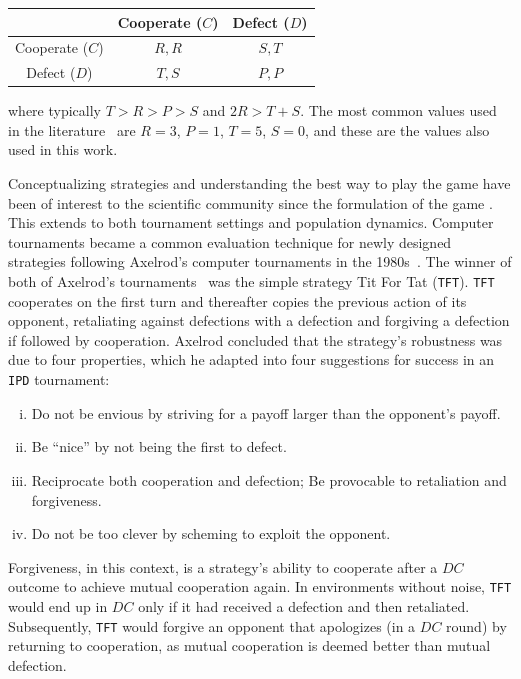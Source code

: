 \documentclass{article}
\def\TFT{\texttt{TFT}}
\def\IPD{\texttt{IPD}}
\begin{document}
\begin{center}
{\renewcommand{\arraystretch}{2}%
\begin{tabular}{c|c|c}
& Cooperate (\(C\)) & Defect (\(D\)) \\
\hline
Cooperate (\(C\)) & \(R, R\) & \(S, T\) \\
\hline
Defect (\(D\)) & \(T, S\) & \(P, P\) \\
\end{tabular}}
\end{center}

where typically \(T > R > P > S\) and \(2R > T + S\). The most common values
used in the literature~\cite{Axelrod1981} are \(R=3\), \(P=1\), \(T=5\),
\(S=0\), and these are the values also used in this work.



Conceptualizing strategies and understanding the best way to play the game have
been of interest to the scientific community since the formulation of the game
\cite{Axelrod1980a, Beaufils1997, Press2012, Tzafestas2000, Hilbe2017,
Glynatsi2020, Murase2021, Schmid2022, Chen2023}.
This extends to both tournament settings and population dynamics.
Computer tournaments became a common evaluation technique for newly designed
strategies following Axelrod's computer tournaments in the
1980s~\cite{Axelrod1980a, Axelrod1980b}.
The winner of both of Axelrod's tournaments~\cite{Axelrod1980a, Axelrod1980b}
was the simple strategy Tit For Tat (\TFT{}). \TFT{} cooperates on the first turn
and thereafter copies the previous action of its opponent, retaliating against
defections with a defection and forgiving a defection if followed by
cooperation. Axelrod concluded that the strategy's robustness was due to four
properties, which he adapted into four suggestions for success in an \IPD{}
tournament:

\begin{enumerate}[(i)]
    \item Do not be envious by striving for a payoff larger than the opponent's payoff.
    \item Be ``nice'' by not being the first to defect.
    \item Reciprocate both cooperation and defection; Be provocable to retaliation and forgiveness.
    \item Do not be too clever by scheming to exploit the opponent.
\end{enumerate}

Forgiveness, in this context, is a strategy's ability to cooperate after a
\(DC\) outcome to achieve mutual cooperation again. In environments without
noise, \TFT{} would end up in \(DC\) only if it had received a defection and
then retaliated. Subsequently, \TFT{} would forgive an opponent that apologizes
(in a \(DC\) round) by returning to cooperation, as mutual cooperation is deemed
better than mutual defection.
\end{document}
